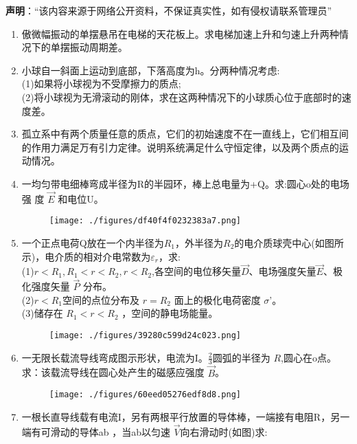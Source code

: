 
\textbf{声明}：“该内容来源于网络公开资料，不保证真实性，如有侵权请联系管理员”


\begin{enumerate}
\item 傲微幅振动的单摆悬吊在电梯的天花板上。求电梯加速上升和匀速上升两种情况下的单摆振动周期差。
\item 小球自一斜面上运动到底部，下落高度为h。分两种情况考虑:\\
(1)如果将小球视为不受摩擦力的质点;\\
(2)将小球视为无滑滚动的刚体，求在这两种情况下的小球质心位于底部时的速度差。
\item 孤立系中有两个质量任意的质点，它们的初始速度不在一直线上，它们相互间的作用力满足万有引力定律。说明系统满足什么守恒定律，以及两个质点的运动情况。
\item 一均匀带电细棒弯成半径为R的半园环，棒上总电量为+Q。求:圆心o处的电场强
度 $\vec{E}$ 和电位U。\begin{figure}[ht]
\centering
\texttt{[image: ./figures/df40f4f0232383a7.png]}
\caption{} \label{fig_SSD103_1}
\end{figure}
\item 一个正点电荷Q放在一个内半径为$R_1$，外半径为$R_2$的电介质球壳中心(如图所示)，电介质的相对介电常数为$\varepsilon_r$，求:\\
(1)$r<R_1,R_1<r<R_2,r<R_2$,各空间的电位移矢量$\vec D$、电场强度矢量$\vec{E}$、极化强度矢量 $\vec P$ 分布。\\
(2)$r<R_1$空间的点位分布及 $r=R_2$ 面上的极化电荷密度 $\sigma$'。\\
(3)储存在 $R_1<r<R_2$ ，空间的静电场能量。
\begin{figure}[ht]
\centering
\texttt{[image: ./figures/39280c599d24c023.png]}
\caption{} \label{fig_SSD103_2}
\end{figure}
\item 一无限长载流导线弯成图示形状，电流为I。$\frac{2}{3}$圆弧的半径为 $R$,圆心在o点。求：该载流导线在圆心处产生的磁感应强度 $\vec B$。
\begin{figure}[ht]
\centering
\texttt{[image: ./figures/60eed05276edf8d8.png]}
\caption{} \label{fig_SSD103_3}
\end{figure}
\item 一根长直导线载有电流I，另有两根平行放置的导体棒，一端接有电阻R，另一端有可滑动的导体ab ，当ab以匀速 $\vec V$向右滑动时(如图)求:\\

\end{enumerate}
